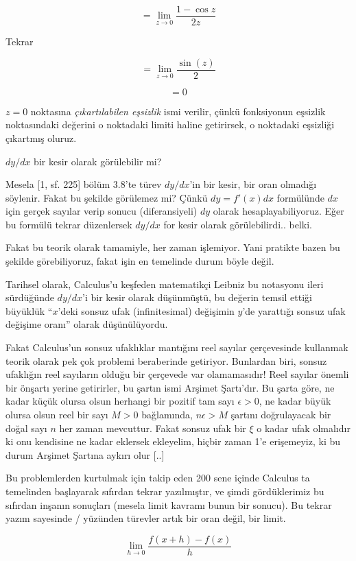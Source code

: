 \documentclass[12pt,fleqn]{article}\usepackage{../../common}
\begin{document}
$$ = \lim_{z \to 0} \frac{1 - \cos z}{2z} $$

Tekrar

$$ = \lim_{z \to 0} \frac{ \sin(z)}{2} $$

$$ = 0 $$

$z=0$ noktasına {\em çıkartılabilen eşsizlik} ismi verilir, çünkü
fonksiyonun eşsizlik noktasındaki değerini o noktadaki limiti haline
getirirsek, o noktadaki eşsizliği çıkartmış oluruz. 

\newpage

$dy/dx$ bir kesir olarak görülebilir mi? 

Mesela [1, sf. 225] bölüm 3.8'te türev $dy/dx$'in bir kesir, bir oran
olmadığı söylenir. Fakat bu şekilde görülemez mi? Çünkü $dy = f'(x)dx$
formülünde $dx$ için gerçek sayılar verip sonucu (diferansiyeli) $dy$
olarak hesaplayabiliyoruz. Eğer bu formülü tekrar düzenlersek $dy/dx$ for
kesir olarak görülebilirdi.. belki.

Fakat bu teorik olarak tamamiyle, her zaman işlemiyor. Yani pratikte bazen
bu şekilde görebiliyoruz, fakat işin en temelinde durum böyle değil.

Tarihsel olarak, Calculus'u keşfeden matematikçi Leibniz bu notasyonu ileri
sürdüğünde $dy/dx$'i bir kesir olarak düşünmüştü, bu değerin temsil ettiği
büyüklük ``$x$'deki sonsuz ufak (infinitesimal) değişimin $y$'de yarattığı
sonsuz ufak değişime oranı'' olarak düşünülüyordu.

Fakat Calculus'un sonsuz ufaklıklar mantığını reel sayılar çerçevesinde
kullanmak teorik olarak pek çok problemi beraberinde getiriyor. Bunlardan
biri, sonsuz ufaklığın reel sayıların olduğu bir çerçevede var
olamamasıdır! Reel sayılar önemli bir önşartı yerine getirirler, bu şartın
ismi Arşimet Şartı'dır. Bu şarta göre, ne kadar küçük olursa olsun herhangi
bir pozitif tam sayı $\epsilon > 0$, ne kadar büyük olursa olsun reel bir
sayı $M>0$ bağlamında, $n\epsilon > M$ şartını doğrulayacak bir doğal sayı
$n$ her zaman mevcuttur. Fakat sonsuz ufak bir $\xi$ o kadar ufak olmalıdır
ki onu kendisine ne kadar eklersek ekleyelim, hiçbir zaman 1'e erişemeyiz,
ki bu durum Arşimet Şartına aykırı olur [..]

Bu problemlerden kurtulmak için takip eden 200 sene içinde Calculus ta
temelinden başlayarak sıfırdan tekrar yazılmıştır, ve şimdi gördüklerimiz
bu sıfırdan inşanın sonuçları (mesela limit kavramı bunun bir sonucu). Bu
tekrar yazım sayesinde / yüzünden türevler artık bir oran değil, bir limit.

$$ \lim_{h \to 0} \frac{f(x+h) - f(x)}{h}$$
\end{document}
